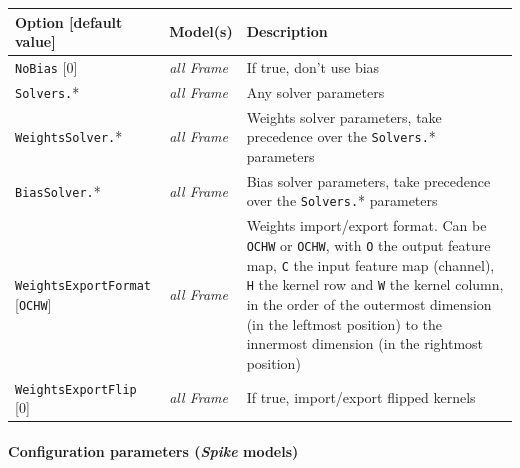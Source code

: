 \documentclass[a4paper,11pt,oneside]{article}
\begin{document}
\begin{center}
 \begin{longtable}{| p{4cm} | p{3cm} | p{9cm} | }
 \hline
 Option [default value] & Model(s) & Description\\
 \hline\hline
  \lstinline!NoBias! [0] & \emph{all Frame} & If true, don't use bias \\
  \lstinline!Solvers.!* & \emph{all Frame} & Any solver parameters \\
  \lstinline!WeightsSolver.!* & \emph{all Frame} & Weights solver parameters,
  take precedence over the \lstinline!Solvers.!* parameters \\
  \lstinline!BiasSolver.!* & \emph{all Frame} & Bias solver parameters,
  take precedence over the \lstinline!Solvers.!* parameters \\
  \lstinline!WeightsExportFormat! [\lstinline!OCHW!] & \emph{all Frame} &
  Weights import/export format. Can be \lstinline!OCHW! or \lstinline!OCHW!,
  with \lstinline!O! the output feature map, \lstinline!C! the input feature map
   (channel), \lstinline!H! the kernel row and \lstinline!W! the kernel column,
   in the order of the outermost dimension (in the leftmost position) to the
   innermost dimension (in the rightmost position) \\
  \lstinline!WeightsExportFlip! [0] & \emph{all Frame} & If true,
  import/export flipped kernels \\
 \hline
\end{longtable}
\end{center}

\paragraph{Configuration parameters (\emph{Spike} models)}
\end{document}
